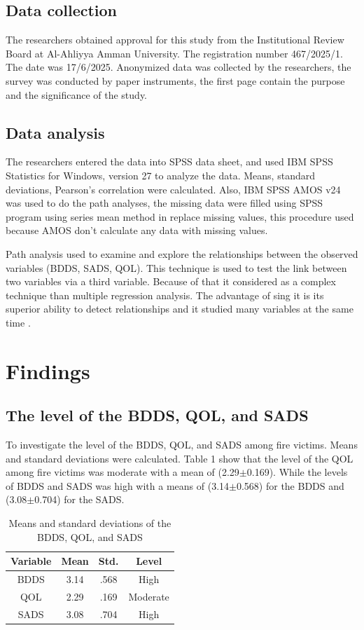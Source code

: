 \documentclass[10pt]{NSP1}
\begin{document}
	\subsection{Data collection}
	The researchers obtained approval for this study from the Institutional Review Board at Al-Ahliyya Amman University. The registration number 467/2025/1. The date was 17/6/2025. Anonymized data was collected by the researchers, the survey was conducted by paper instruments, the first page contain the purpose and the significance of the study.
	
	\subsection{Data analysis}
	The researchers entered the data into SPSS data sheet, and used IBM SPSS Statistics for Windows, version 27 to analyze the data. Means, standard deviations, Pearson's correlation were calculated. Also, IBM SPSS AMOS v24 was used to do the path analyses, the missing data were filled using SPSS program using series mean method in replace missing values, this procedure used because AMOS don't calculate any data with missing values.
	
	Path analysis used to examine and explore the relationships between the observed variables (BDDS, SADS, QOL). This technique is used to test the link between two variables via a third variable. Because of that it considered as a complex technique than multiple regression analysis. The advantage of sing it is its superior ability to detect relationships and it studied many variables at the same time \cite{Garson2014}.
	
	\section{Findings}
	
	\subsection{The level of the BDDS, QOL, and SADS}
	To investigate the level of the BDDS, QOL, and SADS among fire victims. Means and standard deviations were calculated. Table 1 show that the level of the QOL among fire victims was moderate with a mean of (2.29$\pm$0.169). While the levels of BDDS and SADS was high with a means of (3.14$\pm$0.568) for the BDDS and (3.08$\pm$0.704) for the SADS.
	
	\begin{table}[H]
		\centering
		\caption{Means and standard deviations of the BDDS, QOL, and SADS}
		\label{tab:descriptives}
		\vspace{5pt}
		\small
		\begin{tabular}{cccc}
			\hline
			Variable & Mean & Std. & Level \\
			\hline
			BDDS & 3.14 & .568 & High \\
			QOL & 2.29 & .169 & Moderate \\
			SADS & 3.08 & .704 & High \\
			\hline
		\end{tabular}
	\end{table}
	
\end{document}

